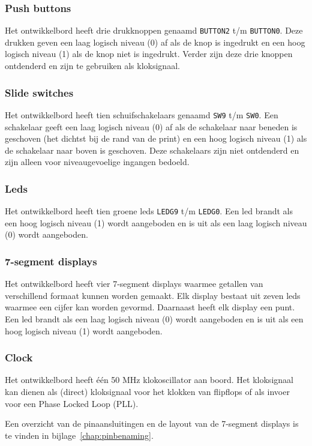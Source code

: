 \documentclass[a4paper,12pt,fleqn,twoside]{book}
\newcommand{\naam}[1]{\texttt{#1}}
\begin{document}
\subsubsection{Push buttons}
Het ontwikkelbord heeft drie drukknoppen genaamd \naam{BUTTON2} t/m
\naam{BUTTON0}. Deze drukken geven een laag logisch
niveau (0) af als de knop is ingedrukt en een hoog logisch niveau (1) als de
knop niet is ingedrukt. Verder zijn deze drie knoppen ontdenderd en zijn te
gebruiken als kloksignaal.

\subsubsection{Slide switches}
Het ontwikkelbord heeft tien schuifschakelaars genaamd \naam{SW9} t/m
\naam{SW0}. Een schakelaar geeft een laag
logisch niveau (0) af als de schakelaar naar beneden is geschoven (het dichtst
bij de rand van de print) en een hoog logisch niveau (1) als de schakelaar naar
boven is geschoven. Deze schakelaars zijn niet ontdenderd en zijn alleen voor
niveaugevoelige ingangen bedoeld.

\subsubsection{Leds}
Het ontwikkelbord heeft tien groene leds \naam{LEDG9} t/m \naam{LEDG0}. Een
led brandt als een hoog logisch niveau (1) wordt aangeboden en is uit als een
laag logisch niveau (0) wordt aangeboden.

\subsubsection{7-segment displays}
Het ontwikkelbord heeft vier 7-segment displays waarmee getallen van
verschillend formaat kunnen worden gemaakt. Elk display bestaat uit zeven leds
waarmee een cijfer kan worden gevormd. Daarnaast heeft elk display een punt.
Een led brandt als een laag logisch niveau (0) wordt aangeboden en is uit als
een hoog logisch niveau (1) wordt aangeboden.

\subsubsection{Clock}
Het ontwikkelbord heeft \'{e}\'{e}n 50 MHz klokoscillator aan boord. Het
kloksignaal kan dienen als (direct) kloksignaal voor het klokken van flipflops
of als invoer voor een Phase Locked Loop (PLL).

Een overzicht van de pinaansluitingen en de layout van de 7-segment displays
is te vinden in bijlage~\ref{chap:pinbenaming}.
\end{document}
